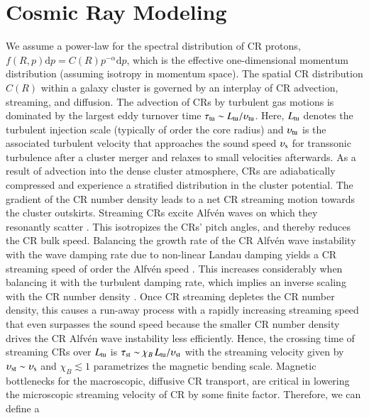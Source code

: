 \documentclass[useAMS,usenatbib]{mn2e}
\newcommand{\dd}{\mathrm{d}}
\newcommand{\vel}{\upsilon}
\begin{document}
\section{Cosmic Ray Modeling}
\label{sec:2.3}
We assume a power-law for the spectral distribution of CR protons, $f(R,p) \dd
p=C(R) p^{-\alpha} \dd p$, which is the effective one-dimensional momentum
distribution (assuming isotropy in momentum space). The spatial CR distribution
$C(R)$ within a galaxy cluster is governed by an interplay of CR advection,
streaming, and diffusion. The advection of CRs by turbulent gas motions is
dominated by the largest eddy turnover time $\tau_{\rmn{tu}}\sim L_{\rmn{tu}}/
\vel_{\rmn{tu}}$. Here, $L_{{\mathrm{tu}}}$ denotes the turbulent injection scale
(typically of order the core radius) and $\vel_{\rmn{tu}}$ is the associated
turbulent velocity that approaches the sound speed $\vel_{\rmn{s}}$ for
transsonic turbulence after a cluster merger and relaxes to small velocities
afterwards. As a result of advection into the dense cluster atmosphere, CRs are
adiabatically compressed and experience a stratified distribution in the cluster
potential. The gradient of the CR number density leads to a net CR streaming
motion towards the cluster outskirts. Streaming CRs excite Alfv{\'e}n waves on
which they resonantly scatter \citep{1969ApJ...156..445K}. This isotropizes the
CRs' pitch angles, and thereby reduces the CR bulk speed. Balancing the growth
rate of the CR Alfv{\'e}n wave instability with the wave damping rate due to
non-linear Landau damping yields a CR streaming speed of order the Alfv{\'e}n
speed \citep{2001ApJ...553..198F}.  This increases considerably when balancing
it with the turbulent damping rate, which implies an inverse scaling with the CR
number density \citep{2013arXiv1303.4746W}.  Once CR streaming depletes the CR
number density, this causes a run-away process with a rapidly increasing
streaming speed that even surpasses the sound speed because the smaller CR
number density drives the CR Alfv{\'e}n wave instability less
efficiently. Hence, the crossing time of streaming CRs over $L_{{\mathrm{tu}}}$ is
$\tau_{\rmn{st}}\sim \chi_B\,L_{\rmn{tu}}/ \vel_{\rmn{st}}$ with the streaming
velocity given by $\vel_{\rmn{st}}\sim \vel_{\rmn{s}}$ and $\chi_B\lesssim 1$
parametrizes the magnetic bending scale.  Magnetic bottlenecks for the
macroscopic, diffusive CR transport, are critical in lowering the microscopic
streaming velocity of CR by some finite factor. Therefore, we can define a
\end{document}
